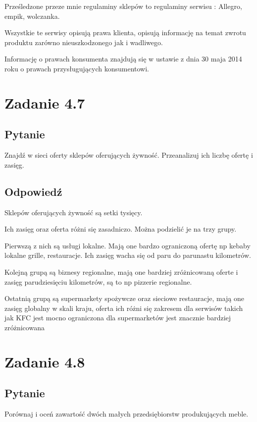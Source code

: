\documentclass[paper=a4, fontsize=11pt]{scrartcl} %
\numberwithin{equation}{section} %
\numberwithin{figure}{section} %
\numberwithin{table}{section} %
\begin{document}
Prześledzone przeze mnie regulaminy sklepów to regulaminy serwisu : Allegro, empik, wolczanka.

Wszystkie te serwisy opisują prawa klienta, opisują informację na temat zwrotu produktu zarówno
nieuszkodzonego jak i wadliwego.

Informację o prawach konsumenta znajdują się w ustawie z dnia 30 maja 2014 roku o prawach przysługujących konsumentowi.

\section{Zadanie 4.7}

\subsection {Pytanie}

Znajdź w sieci oferty sklepów oferujących żywność. Przeanalizuj ich liczbę ofertę i zasięg.

\subsection {Odpowiedź}

Sklepów oferujących żywność są setki tysięcy.

Ich zasięg oraz oferta różni się zasadniczo. Można podzielić je na trzy grupy.

Pierwszą z nich są usługi lokalne. Mają one bardzo ograniczoną ofertę np kebaby lokalne
grille, restauracje. Ich zasięg wacha się od paru do parunastu kilometrów.

Kolejną grupą są biznesy regionalne, mają one bardziej zróżnicowaną oferte i zasięg parudziesięciu
kilometrów, są to np pizzerie regionalne.

Ostatnią grupą są supermarkety spożywcze oraz sieciowe restauracje, mają one zasięg globalny w 
skali kraju, oferta ich różni się zakresem dla serwisów takich jak KFC jest mocno ograniczona
dla supermarketów jest znacznie bardziej zróżnicowana

\section{Zadanie 4.8}

\subsection {Pytanie}

Porównaj i oceń zawartość dwóch małych przedsiębiorstw produkujących meble.
\end{document}
